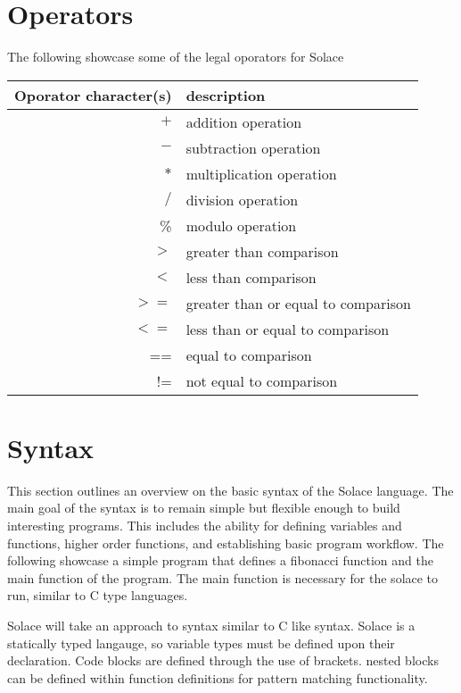 \documentclass{article}
\begin{document}
\section{Operators}
The following showcase some of the legal oporators for Solace

\begin{center}
\begin{tabular}{|r|l|}
\hline
Oporator character(s) & description \\
\hline
\hline
$+$ & addition operation \\
$-$ & subtraction operation \\
$*$ & multiplication operation \\
$/$ & division operation \\
\% & modulo operation \\
$>$ & greater than comparison \\
$<$ & less than comparison \\
$>=$ & greater than or equal to comparison \\
$<=$ & less than or equal to comparison \\
== & equal to comparison \\
!= & not equal to comparison \\
\hline
\end{tabular}
\end{center}


\section{Syntax}
This section outlines an overview on the basic syntax of the Solace language.
The main goal of the syntax is to remain simple but flexible enough to build
interesting programs. This includes the ability for defining variables and functions,
higher order functions, and establishing basic program workflow.
The following showcase a simple program that defines a fibonacci function and 
the main function of the program. The main function is necessary for the solace to
run, similar to C type languages.

Solace will take an approach to syntax similar to C like syntax. Solace is a statically typed
langauge, so variable types must be defined upon their declaration. Code blocks are defined
through the use of brackets. nested blocks can be defined within function definitions
for pattern matching functionality.
\end{document}
